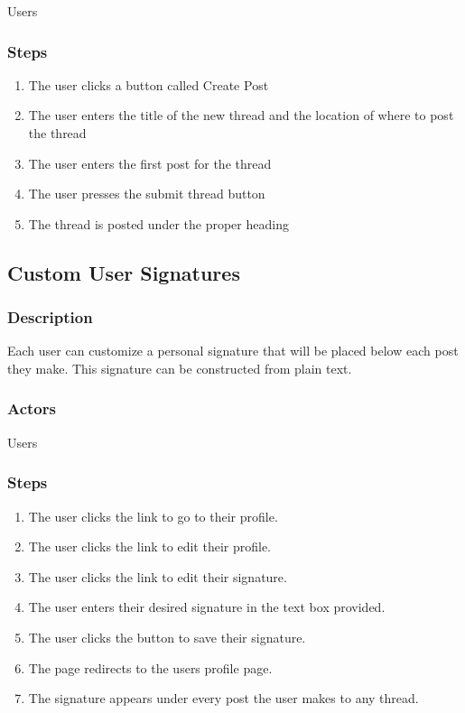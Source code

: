 \documentclass[12pt]{scrartcl}
\begin{document}
Users

\subsubsection{Steps}

\begin{enumerate}
\item The user clicks a button called Create Post 
\item The user enters the title of the new thread and the location of where to post the thread
\item The user enters the first post for the thread
\item The user presses the submit thread button
\item The thread is posted under the proper heading
\end{enumerate}

\subsection{Custom User Signatures}
\subsubsection{Description}

Each user can customize a personal signature that will be placed below each post they make. This signature can be constructed from plain text.

\subsubsection{Actors}

Users

\subsubsection{Steps}

\begin{enumerate}
\item The user clicks the link to go to their profile.
\item The user clicks the link to edit their profile.
\item The user clicks the link to edit their signature.
\item The user enters their desired signature in the text box provided.
\item The user clicks the button to save their signature.
\item The page redirects to the users profile page.
\item The signature appears under every post the user makes to any thread.
\end{enumerate}
\end{document}
